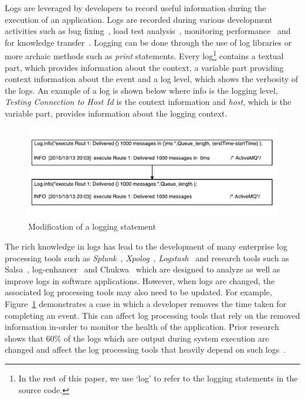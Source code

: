 

Logs are leveraged by developers to record useful information during the execution of an application. Logs are recorded during various development activities such as bug fixing~\cite{ConsoleLogs,JGLouMining,QFuanomaly}, load test analysis~\cite{Automatic}, monitoring performance~\cite{Yuan} and for knowledge transfer~\cite{IanWCRE}.
Logging can be done through the use of log libraries or more archaic methods such as \textsl{print} statements. Every log\footnote{
In the rest of this paper, we use ‘log’ to refer to the logging statements in the source code.} contains a textual part, which provides information about the context, a variable part providing context information about the event and a log level, which shows the verbosity of the logs. An example of a log is shown below where info is the logging level, \textsl{Testing Connection to Host Id} is the context information and \textsl{host}, which is the variable part, provides information about the logging context.

\begin{figure}[tb]
	\centering
	\includegraphics[width=1\columnwidth]{ExampleOfLogChange_LPA}
	\caption{Modification of a logging statement}
	\label{fig:ExampleOfLogChange_LPA}
\end{figure}


The rich knowledge in logs has lead to the development of many enterprise log processing tools such as \textsl{Splunk}~\cite{carasso2012exploring}, \textsl{Xpolog}~\cite{xpolog}, \textsl{Logstash}~\cite{xu2013detecting} and research tools such as Salsa~\cite{TanSalsa}, log-enhancer~\cite{Yuan} and Chukwa~\cite{chukwa} which are designed to analyze as well as improve logs in software applications. However, when logs are changed, the associated log processing tools may also need to be updated. For example, Figure~\ref{fig:ExampleOfLogChange_LPA} demonstrates a case in which a developer removes the time taken for completing an event. This can affect log processing tools that rely on the removed information in-order to monitor the health of the application. Prior research shows that 60\% of the logs which are output during system execution are changed and affect the log processing tools that heavily depend on such logs~\cite{IanWCRE}.

